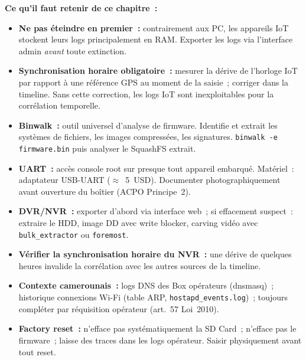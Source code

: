\begin{boxresume}
\textbf{Ce qu'il faut retenir de ce chapitre~:}
\begin{itemize}
    \item \textbf{Ne pas éteindre en premier~:} contrairement aux PC,
          les appareils IoT stockent leurs logs principalement en RAM.
          Exporter les logs via l'interface admin \emph{avant} toute
          extinction.

    \item \textbf{Synchronisation horaire obligatoire~:} mesurer la
          dérive de l'horloge IoT par rapport à une référence GPS
          au moment de la saisie~; corriger dans la timeline. Sans
          cette correction, les logs IoT sont inexploitables pour
          la corrélation temporelle.

    \item \textbf{Binwalk~:} outil universel d'analyse de firmware.
          Identifie et extrait les systèmes de fichiers, les images
          compressées, les signatures. \texttt{binwalk -e firmware.bin}
          puis analyser le SquashFS extrait.

    \item \textbf{UART~:} accès console root sur presque tout
          appareil embarqué. Matériel~: adaptateur USB-UART ($\approx$~5~USD).
          Documenter photographiquement avant ouverture du boîtier
          (ACPO Principe~2).

    \item \textbf{DVR/NVR~:} exporter d'abord via interface web~;
          si effacement suspect~: extraire le HDD, image DD avec
          write blocker, carving vidéo avec \texttt{bulk\_extractor}
          ou \texttt{foremost}.

    \item \textbf{Vérifier la synchronisation horaire du NVR~:} une
          dérive de quelques heures invalide la corrélation avec
          les autres sources de la timeline.

    \item \textbf{Contexte camerounais~:} logs DNS des Box opérateurs
          (dnsmasq)~; historique connexions Wi-Fi (table ARP,
          \texttt{hostapd\_events.log})~; toujours compléter par
          réquisition opérateur (art.~57 Loi~2010).

    \item \textbf{Factory reset~:} n'efface pas systématiquement
          la SD Card~; n'efface pas le firmware~; laisse des traces
          dans les logs opérateur. Saisir physiquement avant
          tout reset.
\end{itemize}
\end{boxresume}

